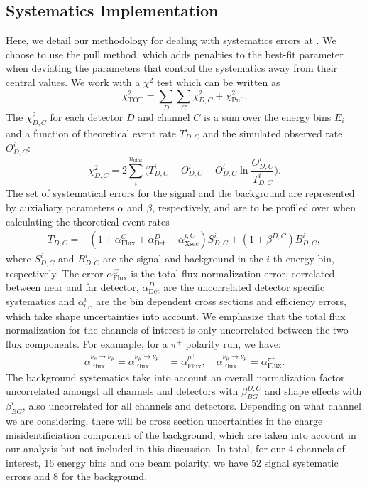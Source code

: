 \subsection{Systematics Implementation \label{sec:appendix_sys}}

Here, we detail our methodology for dealing with systematics errors at \nus. We choose to use the pull method, which adds penalties to the best-fit parameter when deviating the parameters that control the systematics away from their central values. We work with a $\chi^2$ test which can be written as
%
\begin{equation}
\chi^2 _{\text{TOT}} = \sum_{D} \sum_{C} \chi^2_{D, C} + \chi^2_{\text{Pull}}.
\end{equation}
%
The $\chi^2_{D, C}$ for each detector $D$ and channel $C$ is a sum over the energy bins $E_i$ and a function of theoretical event rate $T^i_{D, C}$ and the simulated observed rate $O^i_{D, C}$:
%
\begin{equation}
\chi^2_{D, C} = 2 \sum_{i}^{n_{\text{bins}}} \Big(T^i_{D, C} - O^i_{D, C} + O^i_{D, C} \ln{\frac{O^i_{D, C}}{T^i_{D, C}}}\Big).
\end{equation}
%
The set of systematical errors for the signal and the background are represented by auxialiary parameters $\alpha$ and $\beta$, respectively, and are to be profiled over when calculating the theoretical event rates
%
\begin{align}
T^i_{D, C} =& (1 + \alpha_{\text{Flux}}^C + \alpha_{\text{Det}}^D + \alpha_{\text{Xsec}}^{i, C}) S^i_{D, C} + (1 + \beta^{D,C}) B^i_{D, C},
\end{align}
%
where $S^i_{D, C}$ and $B^i_{D, C}$ are the signal and background in the $i$-th energy bin, respectively. The error $\alpha_{\text{Flux}}^C$ is the total flux normalization error, correlated between near and far detector,  $\alpha_{\text{Det}}^D$ are the uncorrelated detector specific systematics and $\alpha_{\sigma_C}^i$ are the bin dependent cross sections and efficiency errors, which take shape uncertainties into account. We emphasize that the total flux normalization for the channels of interest is only uncorrelated between the two flux components. For examaple, for a $\pi^+$ polarity run, we have:
%
\begin{eqnarray}
\alpha_{\text{Flux}}^{\nu_{e} \to \nu_{\mu}} = \alpha_{\text{Flux}}^{\overline{\nu}_{\mu} \to \overline{\nu}_{\mu}} & =  \alpha_{\text{Flux}}^{\mu^+}, \quad  \alpha_{\text{Flux}}^{\nu_{\mu} \to \nu_{\mu}}  =  \alpha_{\text{Flux}}^{\pi^+}.
\end{eqnarray}
%
The background systematics take into account an overall normalization factor uncorrelated amongst all channels and detectors with $\beta_{BG}^{D,C}$ and shape effects with $\beta_{BG}^{i}$, also uncorrelated for all channels and detectors. Depending on what channel we are considering, there will be cross section uncertainties in the charge misidentificiation component of the background, which are taken into account in our analysis but not included in this discussion. In total, for our 4 channels of interest, 16 energy bins and one beam polarity, we have 52 signal systematic errors and 8 for the background.

